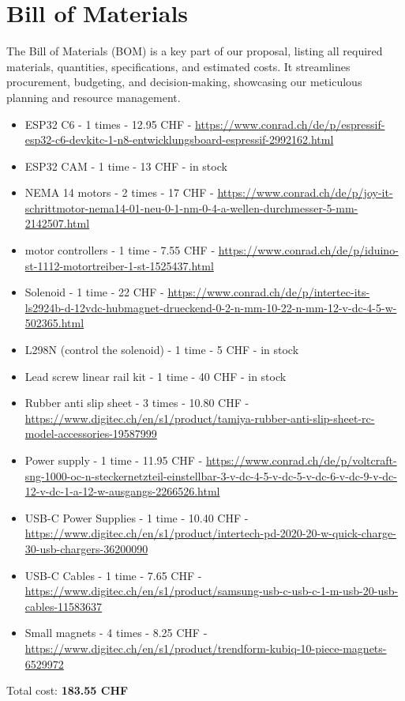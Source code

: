 \section{Bill of Materials}

The Bill of Materials (BOM) is a key part of our proposal, listing all required materials, quantities, specifications, and estimated costs.
It streamlines procurement, budgeting, and decision-making, showcasing our meticulous planning and resource management.

\begin{itemize}
    \item ESP32 C6 - 1 times - 12.95 CHF - \url{https://www.conrad.ch/de/p/espressif-esp32-c6-devkitc-1-n8-entwicklungsboard-espressif-2992162.html}
    \item ESP32 CAM - 1 time - 13 CHF - in stock
    \item NEMA 14 motors - 2 times - 17 CHF - \url{https://www.conrad.ch/de/p/joy-it-schrittmotor-nema14-01-neu-0-1-nm-0-4-a-wellen-durchmesser-5-mm-2142507.html}
    \item motor controllers - 1 time - 7.55 CHF - \url{https://www.conrad.ch/de/p/iduino-st-1112-motortreiber-1-st-1525437.html}
    \item Solenoid - 1 time - 22 CHF - \url{https://www.conrad.ch/de/p/intertec-its-ls2924b-d-12vdc-hubmagnet-drueckend-0-2-n-mm-10-22-n-mm-12-v-dc-4-5-w-502365.html}
    \item L298N (control the solenoid) - 1 time - 5 CHF - in stock
    \item Lead screw linear rail kit - 1 time - 40 CHF - in stock
    \item Rubber anti slip sheet - 3 times - 10.80 CHF - \url{https://www.digitec.ch/en/s1/product/tamiya-rubber-anti-slip-sheet-rc-model-accessories-19587999}
    \item Power supply - 1 time - 11.95 CHF - \url{https://www.conrad.ch/de/p/voltcraft-sng-1000-oc-n-steckernetzteil-einstellbar-3-v-dc-4-5-v-dc-5-v-dc-6-v-dc-9-v-dc-12-v-dc-1-a-12-w-ausgangs-2266526.html}
    \item USB-C Power Supplies - 1 time - 10.40 CHF - \url{https://www.digitec.ch/en/s1/product/intertech-pd-2020-20-w-quick-charge-30-usb-chargers-36200090}
    \item USB-C Cables - 1 time - 7.65 CHF - \url{https://www.digitec.ch/en/s1/product/samsung-usb-c-usb-c-1-m-usb-20-usb-cables-11583637}
    \item Small magnets - 4 times - 8.25 CHF - \url{https://www.digitec.ch/en/s1/product/trendform-kubiq-10-piece-magnets-6529972}
\end{itemize}

Total cost: \textbf{183.55 CHF}
